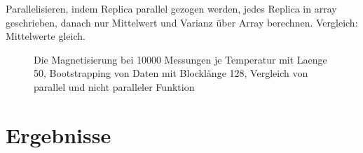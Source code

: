 \documentclass{scrreprt}
\begin{document}
	Parallelisieren, indem Replica parallel gezogen werden, jedes Replica in array geschrieben, danach nur Mittelwert und Varianz über Array berechnen.
	Vergleich: Mittelwerte gleich.
	\begin{figure}
		
		\label{fig:bootstrapparallel-l-128}
		\caption{Die Magnetisierung bei 10000 Messungen je Temperatur mit Laenge 50, Bootstrapping von Daten mit Blocklänge 128, Vergleich von parallel und nicht paralleler Funktion}
	\end{figure}	
	
		
	\chapter{Ergebnisse}
	\listoffigures
	\listoftables
	
	
	
	\printbibliography[heading=bibintoc]
\end{document}
